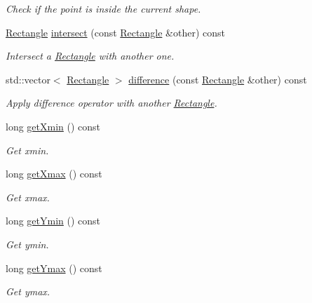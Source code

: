 \begin{DoxyCompactItemize}
\begin{DoxyCompactList}\small\item\em Check if the point is inside the current shape. \end{DoxyCompactList}\item 
\hyperlink{classGeometry_1_1Rectangle}{Rectangle} \hyperlink{classGeometry_1_1Rectangle_afd899e69807bf618719805dff42f574d}{intersect} (const \hyperlink{classGeometry_1_1Rectangle}{Rectangle} \&other) const 
\begin{DoxyCompactList}\small\item\em Intersect a \hyperlink{classGeometry_1_1Rectangle}{Rectangle} with another one. \end{DoxyCompactList}\item 
std\+::vector$<$ \hyperlink{classGeometry_1_1Rectangle}{Rectangle} $>$ \hyperlink{classGeometry_1_1Rectangle_ac803730dcde1c4e059abd1dc962b6314}{difference} (const \hyperlink{classGeometry_1_1Rectangle}{Rectangle} \&other) const 
\begin{DoxyCompactList}\small\item\em Apply difference operator with another \hyperlink{classGeometry_1_1Rectangle}{Rectangle}. \end{DoxyCompactList}\item 
long \hyperlink{classGeometry_1_1Rectangle_a8deb4fa571eaa05911456c14e2fa25ab}{get\+Xmin} () const 
\begin{DoxyCompactList}\small\item\em Get xmin. \end{DoxyCompactList}\item 
long \hyperlink{classGeometry_1_1Rectangle_ab034b771c6a3d7c482daac66a0d97ad8}{get\+Xmax} () const 
\begin{DoxyCompactList}\small\item\em Get xmax. \end{DoxyCompactList}\item 
long \hyperlink{classGeometry_1_1Rectangle_a4fd564dbf894c57e3b04c5f1d9f139cd}{get\+Ymin} () const 
\begin{DoxyCompactList}\small\item\em Get ymin. \end{DoxyCompactList}\item 
long \hyperlink{classGeometry_1_1Rectangle_aebea5b9d1990639bac462fa00714d4a1}{get\+Ymax} () const 
\begin{DoxyCompactList}\small\item\em Get ymax. \end{DoxyCompactList}\item 

\end{DoxyCompactItemize}
